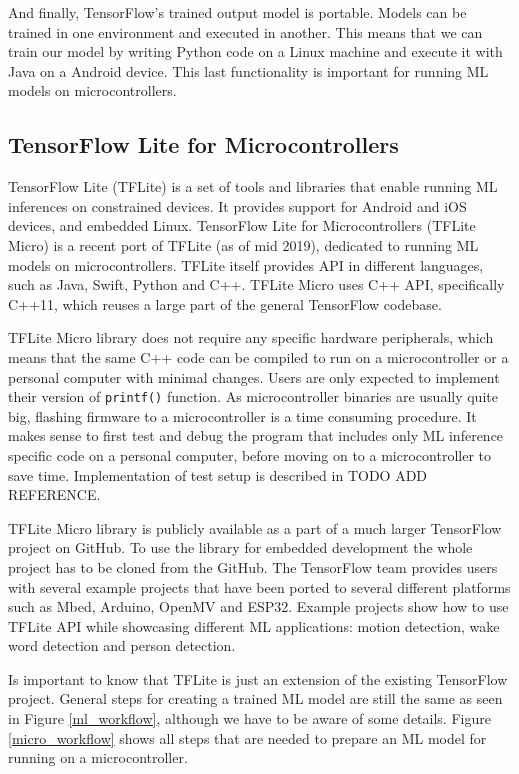 And finally, TensorFlow's trained output model is portable\cite{geron}.
Models can be trained in one environment and executed in another.
This means that we can train our model by writing Python code on a Linux machine and execute it with Java on a Android device.
This last functionality is important for running ML models on microcontrollers.

\subsection{ TensorFlow Lite for Microcontrollers} \label{tflite_quant}

TensorFlow Lite (TFLite) is a set of tools and libraries that enable running ML inferences on constrained devices\cite{tensorflow_github}.
It provides support for Android and iOS devices, and embedded Linux.
TensorFlow Lite for Microcontrollers (TFLite Micro) is a recent port of TFLite (as of mid 2019), dedicated to running ML models on microcontrollers.
TFLite itself provides API in different languages, such as Java, Swift, Python and C++.
TFLite Micro uses C++ API, specifically C++11, which reuses a large part of the general TensorFlow codebase.

TFLite Micro library does not require any specific hardware peripherals, which means that the same C++ code can be compiled to run on a microcontroller or a personal computer with minimal changes.
Users are only expected to implement their version of \verb|printf()| function.
As microcontroller binaries are usually quite big, flashing firmware to a microcontroller is a time consuming procedure.
It makes sense to first test and debug the program that includes only ML inference specific code on a personal computer, before moving on to a microcontroller to save time.
Implementation of test setup is described in TODO ADD REFERENCE.

TFLite Micro library is publicly available as a part of a much larger TensorFlow project on GitHub\cite{tensorflow_github}.
To use the library for embedded development the whole project has to be cloned from the GitHub.
The TensorFlow team provides users with several example projects that have been ported to several different platforms such as Mbed, Arduino, OpenMV and ESP32.
Example projects show how to use TFLite API while showcasing different ML applications: motion detection, wake word detection and person detection.

Is important to know that TFLite is just an extension of the existing TensorFlow project.
General steps for creating a trained ML model are still the same as seen in Figure \ref{ml_workflow}, although we have to be aware of some details.
Figure \ref{micro_workflow} shows all steps that are needed to prepare an ML model for running on a microcontroller.

